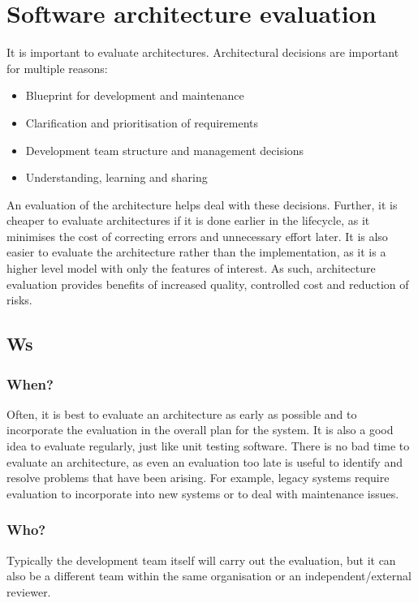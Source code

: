 \documentclass{sty/SizheArticle}
\begin{document}
\section{Software architecture evaluation}
It is important to evaluate architectures. Architectural decisions are
important for multiple reasons:
\begin{itemize}
\item Blueprint for development and maintenance
\item Clarification and prioritisation of requirements
\item Development team structure and management decisions
\item Understanding, learning and sharing
\end{itemize}
An evaluation of the architecture helps deal with these decisions.
Further, it is cheaper to evaluate architectures if it is done
earlier in the lifecycle, as it minimises the cost of correcting
errors and unnecessary effort later. It is also easier to evaluate
the architecture rather than the implementation, as it is a higher
level model with only the features of interest. As such, architecture
evaluation provides benefits of increased quality, controlled cost
and reduction of risks.

\subsection{Ws}

\subsubsection{When?}
Often, it is best to evaluate an architecture as early as possible
and to incorporate the evaluation in the overall plan for the system.
It is also a good idea to evaluate regularly, just like unit testing
software. There is no bad time to evaluate an architecture, as even
an evaluation too late is useful to identify and resolve problems
that have been arising. For example, legacy systems require evaluation
to incorporate into new systems or to deal with maintenance issues.

\subsubsection{Who?}
Typically the development team itself will carry out the evaluation, but
it can also be a different team within the same organisation or an
independent/external reviewer.
\end{document}
